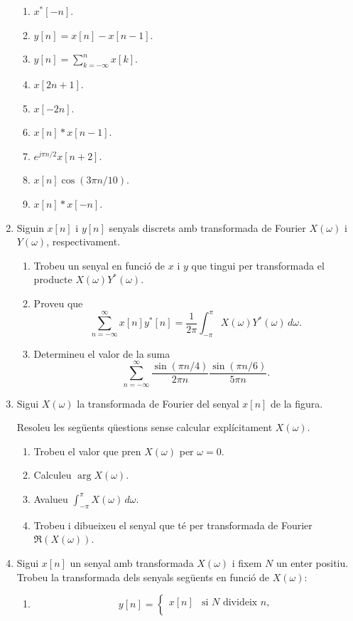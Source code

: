 \documentclass[a4paper,12pt]{article}
\def\figura#1{\begin{figure}[htbp]\centering\end{figure}\par}
\begin{document}
\begin{enumerate}
\begin{enumerate}
  \item $x^*[-n]$.
  \item $y[n]=x[n]-x[n-1]$.
  \item $y[n]=\sum_{k=-\infty}^n x[k]$.
  \item $x[2n+1]$.
  \item $x[-2n]$.
  \item $x[n]*x[n-1]$.
  \item $e^{j \pi n/2}x[n+2]$.
  \item $x[n]\cos(3\pi n/10)$.
  \item $x[n]*x[-n]$.
  \end{enumerate}
\item Siguin $x[n]$ i $y[n]$ senyals discrets amb transformada de
  Fourier $X(\omega)$ i $Y(\omega)$, respectivament.
  \begin{enumerate}
  \item Trobeu un senyal en funció de $x$ i $y$ que tingui per
    transformada el producte $X(\omega)Y^*(\omega)$.
  \item Proveu que
    $$\sum_{n=-\infty}^\infty x[n]y^*[n]=\frac1{2\pi}\int_{-\pi}^\pi
    X(\omega)Y^*(\omega)\,d\omega.$$
  \item Determineu el valor de la suma
    $$\sum_{n=-\infty}^\infty \frac{\sin(\pi n/4)}{2\pi
      n}\frac{\sin(\pi n/6)}{5\pi n}.$$
  \end{enumerate}
\item Sigui $X(\omega)$ la transformada de Fourier del senyal $x[n]$
  de la figura.
  \figura{probl3.exc1.pstex_t}
  Resoleu les següents qüestions sense calcular explícitament
  $X(\omega)$. 
  \begin{enumerate}
  \item Trobeu el valor que pren $X(\omega)$ per $\omega=0$.
  \item Calculeu $\arg X(\omega)$.
  \item Avalueu $\int_{-\pi}^\pi X(\omega)\,d\omega$.
  \item Trobeu i dibueixeu el senyal que té per transformada de
    Fourier $\Re(X(\omega))$.
  \end{enumerate}
\item Sigui $x[n]$ un senyal amb transformada $X(\omega)$ i fixem $N$
  un enter positiu. Trobeu la
  transformada dels senyals següents en funció de $X(\omega)$:
  \begin{enumerate}
  \item
    $$y[n]=\begin{cases}
      x[n] & \text{si $N$ divideix $n$,} \\

\end{cases}$$
\end{enumerate}
\end{enumerate}
\end{document}
